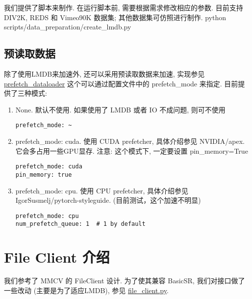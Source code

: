 \documentclass[../main.tex]{subfiles}
\begin{document}
我们提供了脚本来制作. 在运行脚本前, 需要根据需求修改相应的参数. 目前支持 DIV2K, REDS 和 Vimeo90K 数据集; 其他数据集可仿照进行制作.
python scripts/data\_preparation/create\_lmdb.py

\subsection{预读取数据}

除了使用LMDB来加速外, 还可以采用预读取数据来加速, 实现参见\href{https://github.com/XPixelGroup/BasicSR/blob/master/basicsr/data/prefetch_dataloader.py}{prefetch\_dataloader}
这个可以通过配置文件中的 prefetch\_mode 来指定. 目前提供了三种模式:

\begin{enumerate}
    \item None. 默认不使用. 如果使用了 LMDB 或者 IO 不成问题, 则可不使用
          \begin{verbatim}
prefetch_mode: ~
\end{verbatim}

    \item prefetch\_mode: cuda. 使用 CUDA prefetcher, 具体介绍参见 NVIDIA/apex. 它会多占用一些GPU显存. 注意: 这个模式下, 一定要设置 pin\_memory=True
          \begin{verbatim}
prefetch_mode: cuda
pin_memory: true
\end{verbatim}

    \item prefetch\_mode: cpu. 使用 CPU prefetcher, 具体介绍参见 IgorSusmelj/pytorch-styleguide. (目前测试，这个加速不明显)
          \begin{verbatim}
prefetch_mode: cpu
num_prefetch_queue: 1  # 1 by default
\end{verbatim}

\end{enumerate}



\section{File Client 介绍}\label{data_preparation:file_client}

我们参考了 MMCV 的 FileClient 设计. 为了使其兼容 BasicSR, 我们对接口做了一些改动 (主要是为了适应LMDB), 参见 \href{https://github.com/XPixelGroup/BasicSR/blob/master/basicsr/utils/file_client.py}{file\_client.py}.
\end{document}
